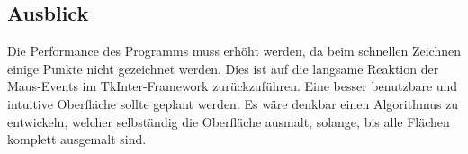 \subsection{Ausblick}
\label{subsec:ausblick}
Die Performance des Programms muss erhöht werden, da beim schnellen Zeichnen einige Punkte nicht gezeichnet werden. Dies ist auf die langsame Reaktion der Maus-Events im TkInter-Framework zurückzuführen. Eine besser benutzbare und intuitive Oberfläche sollte geplant werden. Es wäre denkbar einen Algorithmus zu entwickeln, welcher selbständig die Oberfläche ausmalt, solange, bis alle Flächen komplett ausgemalt sind.
